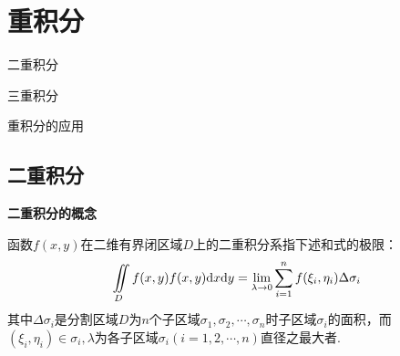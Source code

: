\setcounter{chapter}{8}

\chapter{重积分}

\begin{introduction}
    \item 二重积分
    \item 三重积分
    \item 重积分的应用
\end{introduction}

\section{二重积分}
\textbf{二重积分的概念}

函数$f(x,y)$在二维有界闭区域$D$上的二重积分系指下述和式的极限：
\begin{equation*}
    \iint \limits_{D} f(x,y) f(x,y)\mathrm{d} x\mathrm{d} y=\lim_{\lambda\rightarrow 0}\sum_{i=1}^n f(\xi_i,\eta_i)\Delta \sigma_i
\end{equation*}
其中$\Delta \sigma_i$是分割区域$D$为$n$个子区域$\sigma_1,\sigma_2,\cdots,\sigma_n$时子区域$\sigma_i$的面积，而$(\xi_i,\eta_i)\in\sigma_i,\lambda$为各子区域$\sigma_i(i=1,2,\cdots,n)$直径之最大者.

